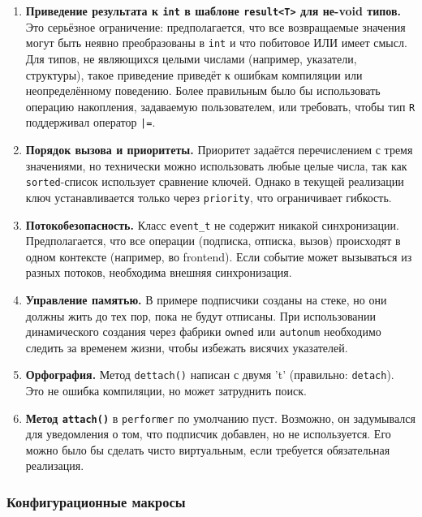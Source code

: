 \documentclass[a4paper,12pt]{article}
\begin{document}
\begin{enumerate}
       \item \textbf{Приведение результата к \texttt{int} в шаблоне \texttt{result<T>} для не-void типов.} Это серьёзное ограничение: предполагается, что все возвращаемые значения могут быть неявно преобразованы в \texttt{int} и что побитовое ИЛИ имеет смысл. Для типов, не являющихся целыми числами (например, указатели, структуры), такое приведение приведёт к ошибкам компиляции или неопределённому поведению. Более правильным было бы использовать операцию накопления, задаваемую пользователем, или требовать, чтобы тип \texttt{R} поддерживал оператор \texttt{|=}.

    \item \textbf{Порядок вызова и приоритеты.} Приоритет задаётся перечислением с тремя значениями, но технически можно использовать любые целые числа, так как \texttt{sorted}-список использует сравнение ключей. Однако в текущей реализации ключ устанавливается только через \texttt{priority}, что ограничивает гибкость.

    \item \textbf{Потокобезопасность.} Класс \texttt{event\_t} не содержит никакой синхронизации. Предполагается, что все операции (подписка, отписка, вызов) происходят в одном контексте (например, во frontend). Если событие может вызываться из разных потоков, необходима внешняя синхронизация.

    \item \textbf{Управление памятью.} В примере подписчики созданы на стеке, но они должны жить до тех пор, пока не будут отписаны. При использовании динамического создания через фабрики \texttt{owned} или \texttt{autonum} необходимо следить за временем жизни, чтобы избежать висячих указателей.

    \item \textbf{Орфография.} Метод \texttt{dettach()} написан с двумя 't' (правильно: \texttt{detach}). Это не ошибка компиляции, но может затруднить поиск.

    \item \textbf{Метод \texttt{attach()}} в \texttt{performer} по умолчанию пуст. Возможно, он задумывался для уведомления о том, что подписчик добавлен, но не используется. Его можно было бы сделать чисто виртуальным, если требуется обязательная реализация.
\end{enumerate}

\subsubsection{Конфигурационные макросы}
\end{document}
